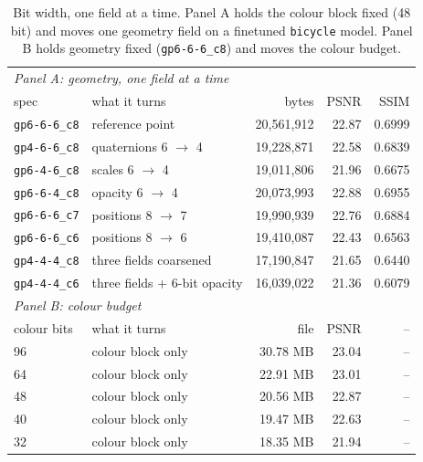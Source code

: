\begin{table}[t]
\centering
\small
\footnotesize
\setlength{\tabcolsep}{2.8pt}
\caption{Bit width, one field at a time. Panel A holds the colour block fixed (48 bit) and moves one geometry field on a finetuned \texttt{bicycle} model. Panel B holds geometry fixed (\texttt{gp6-6-6\_c8}) and moves the colour budget.}
\label{tab:bits}
\begin{tabular}{llrrr}
\toprule
\multicolumn{5}{l}{\emph{Panel A: geometry, one field at a time}} \\
spec & what it turns & bytes & PSNR & SSIM \\
\midrule
\texttt{gp6-6-6\_c8} & reference point & 20,561,912 & 22.87 & 0.6999 \\
\texttt{gp4-6-6\_c8} & quaternions 6 $\rightarrow$ 4 & 19,228,871 & 22.58 & 0.6839 \\
\texttt{gp6-4-6\_c8} & scales 6 $\rightarrow$ 4 & 19,011,806 & 21.96 & 0.6675 \\
\texttt{gp6-6-4\_c8} & opacity 6 $\rightarrow$ 4 & 20,073,993 & 22.88 & 0.6955 \\
\texttt{gp6-6-6\_c7} & positions 8 $\rightarrow$ 7 & 19,990,939 & 22.76 & 0.6884 \\
\texttt{gp6-6-6\_c6} & positions 8 $\rightarrow$ 6 & 19,410,087 & 22.43 & 0.6563 \\
\texttt{gp4-4-4\_c8} & three fields coarsened & 17,190,847 & 21.65 & 0.6440 \\
\texttt{gp4-4-4\_c6} & three fields + 6-bit opacity & 16,039,022 & 21.36 & 0.6079 \\
\midrule
\multicolumn{5}{l}{\emph{Panel B: colour budget}} \\
colour bits & what it turns & file & PSNR & -- \\
\midrule
96 & colour block only & 30.78 MB & 23.04 & -- \\
64 & colour block only & 22.91 MB & 23.01 & -- \\
48 & colour block only & 20.56 MB & 22.87 & -- \\
40 & colour block only & 19.47 MB & 22.63 & -- \\
32 & colour block only & 18.35 MB & 21.94 & -- \\
\bottomrule
\end{tabular}
\end{table}
